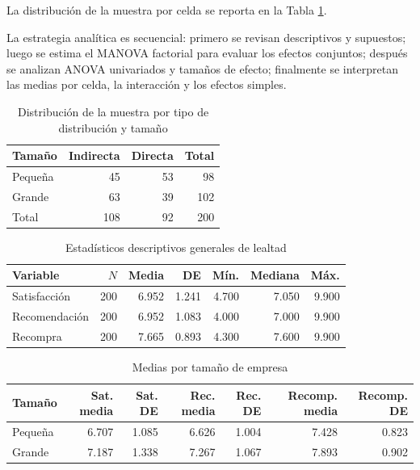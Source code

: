 \documentclass[12pt,letterpaper]{article}
\begin{document}
La distribución de la muestra por celda se reporta en la Tabla \ref{tab:p4-distribucion-muestra}.

La estrategia analítica es secuencial: primero se revisan descriptivos y supuestos; luego se estima el MANOVA factorial para evaluar los efectos conjuntos; después se analizan ANOVA univariados y tamaños de efecto; finalmente se interpretan las medias por celda, la interacción y los efectos simples.


\begin{table}[H]
\centering
\caption{Distribución de la muestra por tipo de distribución y tamaño}
\label{tab:p4-distribucion-muestra}
\begin{tabular}{lrrr}
\toprule
Tamaño & Indirecta & Directa & Total \\
\midrule
Pequeña & 45 & 53 & 98 \\
Grande & 63 & 39 & 102 \\
\midrule
Total & 108 & 92 & 200 \\
\bottomrule
\end{tabular}
\end{table}

\begin{table}[H]
\centering
\caption{Estadísticos descriptivos generales de lealtad}
\label{tab:p4-descriptivos}
\begin{tabular}{lrrrrrr}
\toprule
Variable & $N$ & Media & DE & Mín. & Mediana & Máx. \\
\midrule
Satisfacción & 200 & 6.952 & 1.241 & 4.700 & 7.050 & 9.900 \\
Recomendación & 200 & 6.952 & 1.083 & 4.000 & 7.000 & 9.900 \\
Recompra & 200 & 7.665 & 0.893 & 4.300 & 7.600 & 9.900 \\
\bottomrule
\end{tabular}
\end{table}

\begin{table}[H]
\centering
\caption{Medias por tamaño de empresa}
\label{tab:p4-medias-tamano}
\begin{tabular}{lrrrrrr}
\toprule
Tamaño & Sat. media & Sat. DE & Rec. media & Rec. DE & Recomp. media & Recomp. DE \\
\midrule
Pequeña & 6.707 & 1.085 & 6.626 & 1.004 & 7.428 & 0.823 \\
Grande & 7.187 & 1.338 & 7.267 & 1.067 & 7.893 & 0.902 \\
\bottomrule
\end{tabular}
\end{table}
\end{document}

